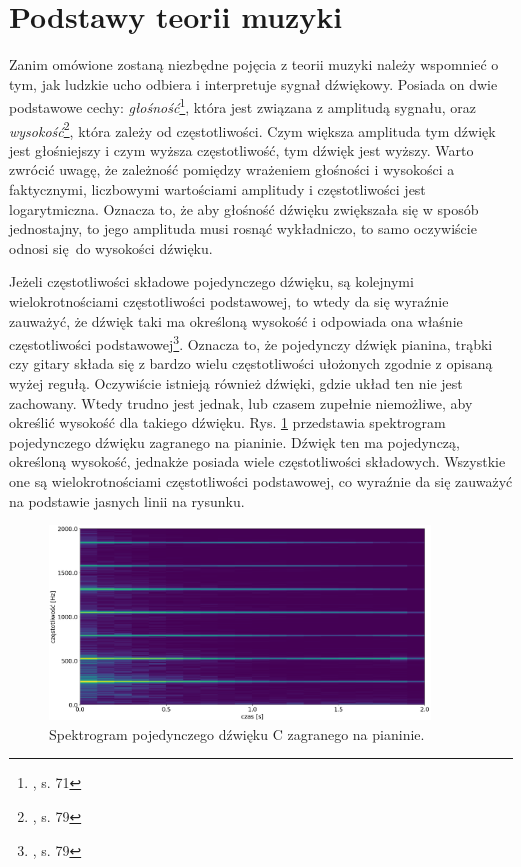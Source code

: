 \section{Podstawy teorii muzyki}

Zanim omówione zostaną niezbędne pojęcia z teorii muzyki należy wspomnieć o tym, jak ludzkie ucho odbiera i interpretuje sygnał dźwiękowy. Posiada on dwie podstawowe cechy: \emph{głośność}\footnote{\cite{lerch_introduction_2012}, s. 71}, która jest związana z amplitudą sygnału, oraz \emph{wysokość}\footnote{\cite{lerch_introduction_2012}, s. 79}, która zależy od częstotliwości. Czym większa amplituda tym dźwięk jest głośniejszy i czym wyższa częstotliwość, tym dźwięk jest wyższy. Warto zwrócić uwagę, że zależność pomiędzy wrażeniem głośności i wysokości a faktycznymi, liczbowymi wartościami amplitudy i częstotliwości jest logarytmiczna. Oznacza to, że aby głośność dźwięku zwiększała się w sposób jednostajny, to jego amplituda musi rosnąć wykładniczo, to samo oczywiście odnosi się do wysokości dźwięku. 

Jeżeli częstotliwości składowe pojedynczego dźwięku, są kolejnymi wielokrotnościami częstotliwości podstawowej, to wtedy da się wyraźnie zauważyć, że dźwięk taki ma określoną wysokość i odpowiada ona właśnie częstotliwości podstawowej\footnote{\cite{lerch_introduction_2012}, s. 79}. Oznacza to, że pojedynczy dźwięk pianina, trąbki czy gitary składa się z bardzo wielu częstotliwości ułożonych zgodnie z opisaną wyżej regułą. Oczywiście istnieją również dźwięki, gdzie układ ten nie jest zachowany. Wtedy trudno jest jednak, lub czasem zupełnie niemożliwe, aby określić wysokość dla takiego dźwięku. Rys. \ref{fig:spektrogram_c} przedstawia spektrogram pojedynczego dźwięku zagranego na pianinie. Dźwięk ten ma pojedynczą, określoną wysokość, jednakże posiada wiele częstotliwości składowych. Wszystkie one są wielokrotnościami częstotliwości podstawowej, co wyraźnie da się zauważyć na podstawie jasnych linii na rysunku.

\begin{figure}[htb]
    \centering
    \includegraphics[width=0.9\textwidth]{images/spektrogram_c}
    \caption{Spektrogram pojedynczego dźwięku C zagranego na pianinie.}
    \label{fig:spektrogram_c}
\end{figure}

